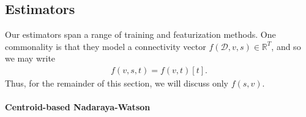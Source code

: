 



\subsection{Estimators}

Our estimators span a range of training and featurization methods.
One commonality is that they model a connectivity vector $f (\mathcal D, v,s)  \in \mathbb R^T$, and so we may write
\begin{eqnarray*}
f (v,s,t) = f (v,t)[t].
\end{eqnarray*}
Thus, for the remainder of this section, we will discuss only $f (s,v)$.



\paragraph{Centroid-based Nadaraya-Watson}

